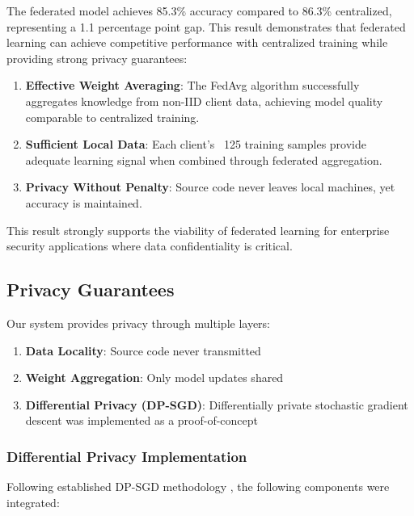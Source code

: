 \documentclass[conference]{IEEEtran}
\begin{document}
The federated model achieves 85.3\% accuracy compared to 86.3\% centralized, representing a 1.1 percentage point gap. This result demonstrates that federated learning can achieve competitive performance with centralized training while providing strong privacy guarantees:

\begin{enumerate}
    \item \textbf{Effective Weight Averaging}: The FedAvg algorithm successfully aggregates knowledge from non-IID client data, achieving model quality comparable to centralized training.
    
    \item \textbf{Sufficient Local Data}: Each client's ~125 training samples provide adequate learning signal when combined through federated aggregation.
    
    \item \textbf{Privacy Without Penalty}: Source code never leaves local machines, yet accuracy is maintained.
\end{enumerate}

This result strongly supports the viability of federated learning for enterprise security applications where data confidentiality is critical.


\subsection{Privacy Guarantees}

Our system provides privacy through multiple layers:

\begin{enumerate}
    \item \textbf{Data Locality}: Source code never transmitted
    \item \textbf{Weight Aggregation}: Only model updates shared
    \item \textbf{Differential Privacy (DP-SGD)}: Differentially private stochastic gradient descent was implemented as a proof-of-concept
\end{enumerate}

\subsubsection{Differential Privacy Implementation}

Following established DP-SGD methodology \cite{abadi2024dpsgd, mcmahan2017learning}, the following components were integrated:
\end{document}
